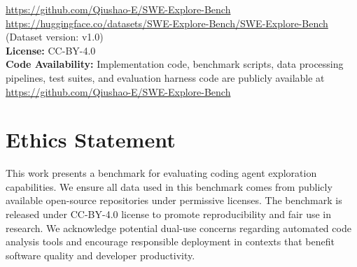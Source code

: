 \documentclass{llmxive}
\providecommand{\todoc}[2]{{\textbf{[#2]}}}
\providecommand{\wang}[1]{\todoc{green}{Wang: #1}}
\begin{document}
\begin{abstract}
(Fig 3, Section 5.4), we now report 95%
\end{abstract}
\begin{center}
\footnotesize
\;\href{https://github.com/Qiushao-E/SWE-Explore-Bench}{\url{https://github.com/Qiushao-E/SWE-Explore-Bench}}\\[-0.3mm]
\raisebox{-0.15em}{}\;\href{https://huggingface.co/datasets/SWE-Explore-Bench/SWE-Explore-Bench}{\url{https://huggingface.co/datasets/SWE-Explore-Bench/SWE-Explore-Bench}} (Dataset version: v1.0)\\[0.3mm]\footnotesize\textbf{License:} CC-BY-4.0\\[0.3mm]\footnotesize\textbf{Code Availability:} Implementation code, benchmark scripts, data processing pipelines, test suites, and evaluation harness code are publicly available at \href{https://github.com/Qiushao-E/SWE-Explore-Bench}{\url{https://github.com/Qiushao-E/SWE-Explore-Bench}}
\end{center}


\section*{Ethics Statement}
This work presents a benchmark for evaluating coding agent exploration capabilities. We ensure all data used in this benchmark comes from publicly available open-source repositories under permissive licenses. The benchmark is released under CC-BY-4.0 license to promote reproducibility and fair use in research. We acknowledge potential dual-use concerns regarding automated code analysis tools and encourage responsible deployment in contexts that benefit software quality and developer productivity.

\end{document}
